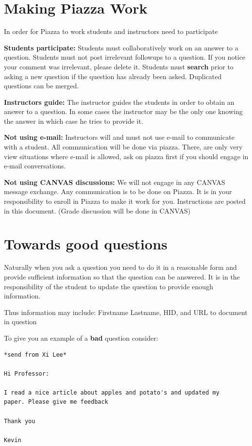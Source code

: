 \section{Making Piazza Work}

In order for Piazza to work students and instructors need to participate

\textbf{Students participate:} Students must collaboratively work on an
answer to a question. Students must not post irrelevant followups to a
question. If you notice your comment was irrelevant, please delete it.
Students must \textbf{search} prior to asking a new question if the
question has already been asked. Duplicated questions can be merged.

\textbf{Instructors guide:} The instructor guides the students in order
to obtain an answer to a question. In some cases the instructor may be
the only one knowing the answer in which case he tries to provide it.

\textbf{Not using e-mail:} Instructors will and must not use e-mail to
communicate with a student. All communication will be done via piazza.
There, are only very view situations where e-mail is allowed, ask on
piazza first if you should engage in e-mail conversations.

\textbf{Not using CANVAS discussions:} We will not engage in any CANVAS
message exchange. Any communication is to be done on Piazza. It is in
your responsibility to enroll in Piazza to make it work for you.
Instructions are posted in this document. (Grade discussion will be
done in CANVAS)

\section{Towards good questions}

Naturally when you ask a question you need to do it in a reasonable form
and provide sufficient information so that the question can be answered.
It is in the responsibility of the student to update the question to
provide enough information.

Thus information may include: Firstname Lastname, HID, and URL
to document in question

To give you an example of a \textbf{bad} question consider:

\begin{verbatim}
*send from Xi Lee*

Hi Professor:

I read a nice article about apples and potato's and updated my
paper. Please give me feedback

Thank you

Kevin
\end{verbatim}

